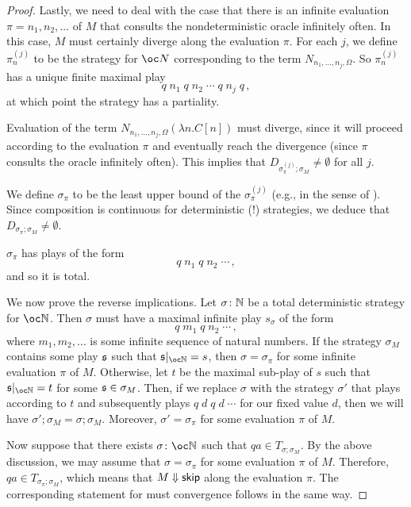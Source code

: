 \documentclass[sigplan,10pt,review]{acmart}\settopmatter{printfolios=true,printccs=false,printacmref=false}
\begin{document}
\begin{proof}
  Lastly, we need to deal with the case that there is an infinite evaluation $\pi = n_1,n_2,\dots$ of $M$ that consults the nondeterministic oracle infinitely often.
  In this case, $M$ must certainly diverge along the evaluation $\pi$.
  For each $j$, we define $\pi_n^{(j)}$ to be the strategy for $\oc N$ corresponding to the term $N_{n_1,\dots,n_j,\Omega}$.  
  So $\pi_n^{(j)}$ has a unique finite maximal play
  \[
    q\;n_1\;q\;n_2\;\cdots\;q\;n_j\;q\,,
    \]
  at which point the strategy has a partiality.  

  Evaluation of the term $N_{n_1,\dots,n_j,\Omega} (\lambda n.C[n])$ must diverge, since it will proceed according to the evaluation $\pi$ and eventually reach the divergence (since $\pi$ consults the oracle infinitely often).  
  This implies that $D_{\sigma_\pi^{(j)};\sigma_M}\ne\emptyset$ for all $j$.

  We define $\sigma_\pi$ to be the least upper bound of the $\sigma_\pi^{(j)}$ (e.g., in the sense of \cite{mcCHFiniteND}).  
  Since composition is continuous for deterministic (!) strategies, we deduce that $D_{\sigma_\pi;\sigma_M}\ne\emptyset$.

  $\sigma_\pi$ has plays of the form
  \[
    q\;n_1\;q\;n_2\;\cdots\,,
    \]
  and so it is total.

  We now prove the reverse implications.  
  Let $\sigma\colon\mathbb{N}$ be a total deterministic strategy for $\oc\bN$.
  Then $\sigma$ must have a maximal infinite play $s_\sigma$ of the form
  \[
    q\;m_1\;q\;n_2\;\cdots\,,
    \]
  where $m_1,m_2,\dots$ is some infinite sequence of natural numbers.  
  If the strategy $\sigma_M$ contains some play $\mathfrak s$ such that $\s\vert_{\oc\bN}=s$, then $\sigma=\sigma_\pi$ for some infinite evaluation $\pi$ of $M$.  
  Otherwise, let $t$ be the maximal sub-play of $s$ such that $\s\vert_{\oc\bN}=t$ for some $\mathfrak s\in\sigma_M$.  
  Then, if we replace $\sigma$ with the strategy $\sigma'$ that plays according to $t$ and subsequently plays $q\;d\;q\;d\;\cdots$ for our fixed value $d$, then we will have $\sigma';\sigma_M=\sigma;\sigma_M$.  
  Moreover, $\sigma'=\sigma_\pi$ for some evaluation $\pi$ of $M$.

  Now suppose that there exists $\sigma\from\oc\bN$ such that $qa\in T_{\sigma;\sigma_M}$.  
  By the above discussion, we may assume that $\sigma=\sigma_\pi$ for some evaluation $\pi$ of $M$.  
  Therefore, $qa\in T_{\sigma_\pi;\sigma_M}$, which means that $M\Downarrow{\mathsf{skip}}$ along the evaluation $\pi$.  
  The corresponding statement for must convergence follows in the same way.
\end{proof}
\end{document}
